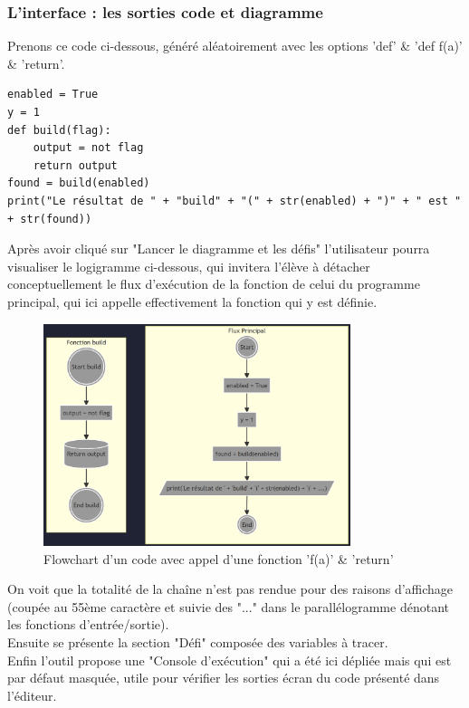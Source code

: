 \documentclass[11pt,a4paper]{article}
\begin{document}
\subsubsection*{L'interface : les sorties code et diagramme}

Prenons ce code ci-dessous, généré aléatoirement avec les options 'def' \& 'def f(a)' \& 'return'.

\begin{verbatim}
enabled = True
y = 1
def build(flag):
    output = not flag
    return output
found = build(enabled)
print("Le résultat de " + "build" + "(" + str(enabled) + ")" + " est " + str(found))
\end{verbatim}

Après avoir cliqué sur "Lancer le diagramme et les défis" l'utilisateur pourra visualiser le logigramme ci-dessous, qui invitera l'élève à détacher conceptuellement le flux d'exécution de la fonction de celui du programme principal, qui ici appelle effectivement la fonction qui y est définie. 
\begin{figure}[H]
    \centering
    \includegraphics[width=0.8\textwidth, keepaspectratio]{Flowchart_def-f-a-return.png}
    \caption{Flowchart d'un code avec appel d'une fonction  'f(a)' \& 'return'}
    \label{Flowchart_def-f-a-return.png}
\end{figure}
On voit que la totalité de la chaîne n'est pas rendue pour des raisons d'affichage (coupée au 55ème caractère et suivie des "..." dans le parallélogramme dénotant les fonctions d'entrée/sortie).\\
Ensuite se présente la section "Défi" composée des variables à tracer.\\ Enfin l'outil propose une "Console d'exécution" qui a été ici dépliée mais qui est par défaut masquée, utile pour vérifier les sorties écran du code présenté dans l'éditeur.\\
\end{document}
